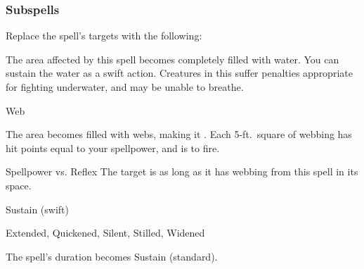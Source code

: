 \subsubsection{Subspells}
Replace the spell's targets with the following:
\begin{spellcontent}
\begin{augmenttargetinginfo}
\end{augmenttargetinginfo}
\end{spellcontent}
The area affected by this spell becomes completely filled with water.
You can sustain the water as a swift action.
Creatures in this  suffer penalties appropriate for fighting underwater, and may be unable to breathe.
\begin{spellsection}{Web}
\begin{spellheader}
\end{spellheader}
\begin{spellcontent}
\begin{spelltargetinginfo}
\end{spelltargetinginfo}
\begin{spelleffects}
\spelleffect
The area becomes filled with webs, making it .
Each 5-ft.\ square of webbing has hit points equal to your spellpower, and is  to fire.
\begin{spellattack}{Spellpower vs. Reflex}
\spellsuccess The target is \immobilized as long as it has webbing from this spell in its space.
\end{spellattack}
\spelldur Sustain (swift)
\end{spelleffects}
\end{spellcontent}
\begin{spellfooter}
 Extended, Quickened, Silent, Stilled, Widened
\end{spellfooter}
\begin{spellsubcontent}
\begin{spellcantrip}
The spell's duration becomes Sustain (standard).
\end{spellcantrip}
\end{spellsubcontent}
\end{spellsection}
